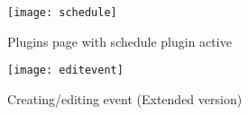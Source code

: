  \par
 
 	\begin{figure}[h]
 		\centering
 		\texttt{[image: schedule]}
 		\caption{Plugins page with schedule plugin active }	
 	\end{figure}



 \par
 
 	\begin{figure}[h]
 		\centering
 		\texttt{[image: editevent]}
 		\caption{Creating/editing event (Extended version)}	
 	\end{figure}
 
 

 
 


\clearpage
